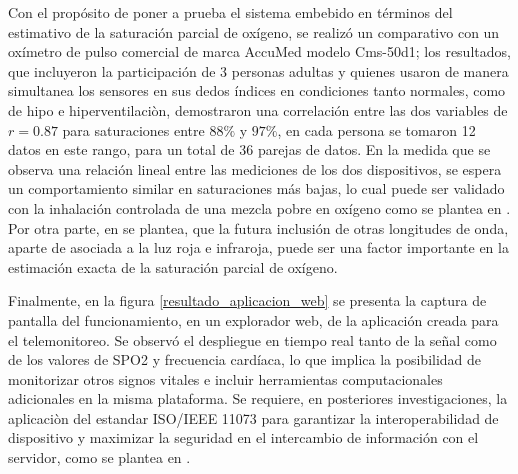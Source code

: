 \documentclass[journal]{IEEEtran}
\begin{document}
Con el propósito de poner a prueba el sistema embebido en términos del estimativo de la saturación parcial de oxígeno, se realizó un comparativo con un oxímetro de pulso comercial de marca AccuMed modelo Cms-50d1; {\color{green}los resultados, que incluyeron la participación de 3 personas adultas y quienes usaron de manera simultanea los sensores en sus dedos índices en condiciones tanto normales, como de hipo e hiperventilaciòn, 
demostraron una correlación entre las dos variables de $r=0.87$ para saturaciones entre $88\%$ y $97\%$,
en cada persona se tomaron 12 datos en este rango, para un total de 36 parejas de datos.} 
En la medida que se observa una relación lineal entre las mediciones de los dos dispositivos, se espera un comportamiento similar en saturaciones más bajas, lo cual puede ser validado con la inhalación controlada de una mezcla pobre en oxígeno como se plantea en \cite{G_validacion_sensor_maxim}. {\color{green} Por otra parte, en \cite{G_revision_oximetro} se plantea, que la futura inclusión de otras longitudes de onda, aparte de asociada a la luz roja e infraroja, puede ser una factor importante en la estimación exacta de la saturación parcial de oxígeno}.




Finalmente, en la figura \ref{resultado_aplicacion_web} se presenta la captura de pantalla del funcionamiento, en un explorador web, de la aplicación creada para el telemonitoreo. Se observó el despliegue en tiempo real tanto de la señal como de los valores de SPO2 y frecuencia cardíaca, lo que implica la posibilidad de monitorizar otros signos vitales e incluir herramientas computacionales adicionales en la misma plataforma. {\color{green}Se requiere, en posteriores investigaciones, la aplicaciòn del estandar ISO/IEEE 11073 para garantizar la interoperabilidad de dispositivo y maximizar la seguridad en el intercambio de información con el servidor, como se plantea en \cite{G_remote_monitoring.pdf}.}
\end{document}
